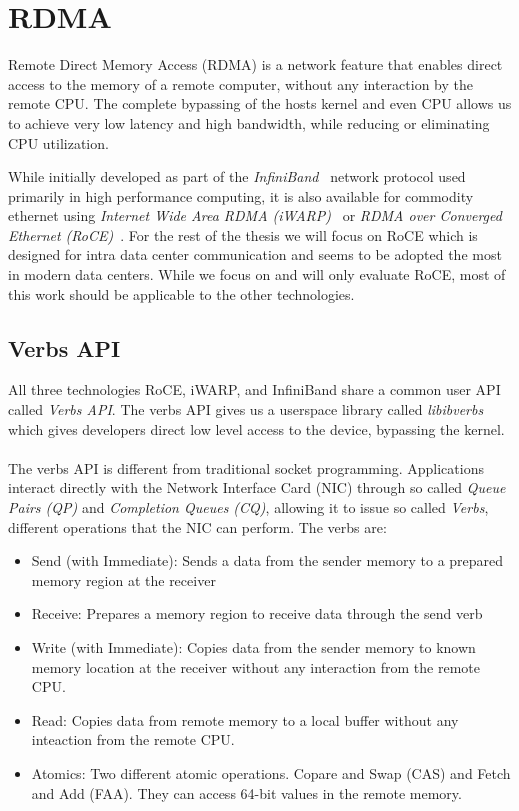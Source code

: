 \section{RDMA}

Remote Direct Memory Access (RDMA) is a network feature that enables direct access to the memory of a remote computer, 
without any interaction by the remote CPU. The complete bypassing of the hosts kernel and even CPU allows us to achieve 
very low latency and high bandwidth, while reducing or eliminating CPU utilization.

While initially developed as part of the \emph{InfiniBand}~\cite{} network protocol used primarily in high performance computing,
it is also available for commodity ethernet using \emph{Internet Wide Area RDMA (iWARP)}~\cite{} or
\emph{RDMA over Converged Ethernet (RoCE)}~\cite{}. For the rest of the thesis we will focus on RoCE which is designed for 
intra data center communication and seems to be adopted the most in modern data centers. 
While we focus on and will only evaluate RoCE, most of this work should be applicable to the other technologies.



\subsection{Verbs API}\label{sec:bg:verbs}

All three technologies RoCE, iWARP, and InfiniBand share a common user API called \emph{Verbs API}. The verbs API gives us a
userspace library called \emph{libibverbs} which gives developers direct low level access to the device, bypassing the kernel.

\paragraph{}The verbs API is different from traditional socket programming. Applications interact directly with the Network 
Interface Card (NIC) through so called \emph{Queue Pairs (QP)} and \emph{Completion Queues (CQ)}, allowing it to issue
so called \emph{Verbs}, different operations that the NIC can perform. The verbs are:

\begin{itemize}
  \item Send (with Immediate): Sends a data from the sender memory to a prepared memory region at the receiver
  \item Receive: Prepares a memory region to receive data through the send verb
  \item Write (with Immediate): Copies data from the sender memory to known memory location at the receiver without any 
    interaction from the remote CPU.
  \item Read: Copies data from remote memory to a local buffer without any inteaction from the remote CPU.
  \item Atomics: Two different atomic operations. Copare and Swap (CAS) and Fetch and Add (FAA). They can access 64-bit 
    values in the remote memory. 
\end{itemize}




